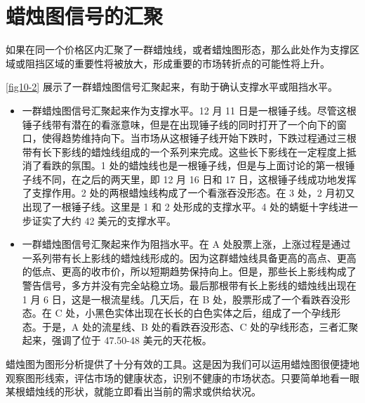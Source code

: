 \chapter{蜡烛图信号的汇聚\label{ch10}}
如果在同一个价格区内汇聚了一群蜡烛线，或者蜡烛图形态，那么此处作为支撑区域或阻挡区域的重要性将被放大，形成重要的市场转折点的可能性将上升。

\autoref{fig10-2} 展示了一群蜡烛图信号汇聚起来，有助于确认支撑水平或阻挡水平。
\begin{itemize}
    \item 一群蜡烛图信号汇聚起来作为支撑水平。12 月 11 日是一根锤子线。尽管这根锤子线带有潜在的看涨意味，但是在出现锤子线的同时打开了一个向下的窗口，使得趋势维持向下。当市场从这根锤子线开始下跌时，下跌过程通过三根带有长下影线的蜡烛线组成的一个系列来完成。这些长下影线在一定程度上抵消了看跌的氛围。1 处的蜡烛线也是一根锤子线，但是与上面讨论的第一根锤子线不同，在之后的两天里，即 12 月 16 日和 17 日，这根锤子线成功地发挥了支撑作用。2 处的两根蜡烛线构成了一个看涨吞没形态。在 3 处，2 月初又出现了一根锤子线。这里是 1 和 2 处形成的支撑水平。4 处的蜻蜓十字线进一步证实了大约 42 美元的支撑水平。
    \item 一群蜡烛图信号汇聚起来作为阻挡水平。在 A 处股票上涨，上涨过程是通过一系列带有长上影线的蜡烛线形成的。因为这群蜡烛线具备更高的高点、更高的低点、更高的收市价，所以短期趋势保持向上。但是，那些长上影线构成了警告信号，多方并没有完全站稳立场。最后那根带有长上影线的蜡烛线出现在 1 月 6 日，这是一根流星线。几天后，在 B 处，股票形成了一个看跌吞没形态。在 C 处，小黑色实体出现在长长的白色实体之后，组成了一个孕线形态。于是，A 处的流星线、B 处的看跌吞没形态、C 处的孕线形态，三者汇聚起来，强调了位于 47.50-48 美元的天花板。
\end{itemize}


蜡烛图为图形分析提供了十分有效的工具。这是因为我们可以运用蜡烛图很便捷地观察图形线索，评估市场的健康状态，识别不健康的市场状态。只要简单地看一眼某根蜡烛线的形状，就能立即看出当前的需求或供给状况。